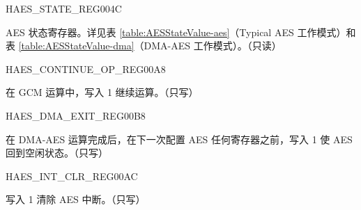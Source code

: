 \begin{register}{H}{AES\_STATE\_REG}{\hexprefix{}004C}\label{regdesc:AESSTATEREG}
%
%
\regnewline%
\begin{regdesc}\begin{reglist}
\item [AES\_STATE] AES 状态寄存器。详见表 \ref{table:AESStateValue-aes}（Typical AES 工作模式）和表 \ref{table:AESStateValue-dma}（DMA-AES 工作模式）。（只读）
\end{reglist}\end{regdesc}
\end{register}


\begin{register}{H}{AES\_CONTINUE\_OP\_REG}{\hexprefix{}00A8}\label{regdesc:AESCONTINUEOPREG}
%
%
\regnewline%
\begin{regdesc}\begin{reglist}
\item [AES\_CONTINUE\_OP] 在 GCM 运算中，写入 1 继续运算。（只写）
\end{reglist}\end{regdesc}
\end{register}


\begin{register}{H}{AES\_DMA\_EXIT\_REG}{\hexprefix{}00B8}\label{regdesc:AESDMAEXITREG}
%
%
\regnewline%
\begin{regdesc}\begin{reglist}
\item [AES\_DMA\_EXIT] 在 DMA-AES 运算完成后，在下一次配置 AES 任何寄存器之前，写入 1 使 AES 回到空闲状态。（只写）
\end{reglist}\end{regdesc}
\end{register}


\begin{register}{H}{AES\_INT\_CLR\_REG}{\hexprefix{}00AC}\label{regdesc:AESINTCLRREG}
%
%
\regnewline%
\begin{regdesc}\begin{reglist}
\item [AES\_INT\_CLR] 写入 1 清除 AES 中断。（只写）
\end{reglist}\end{regdesc}
\end{register}



